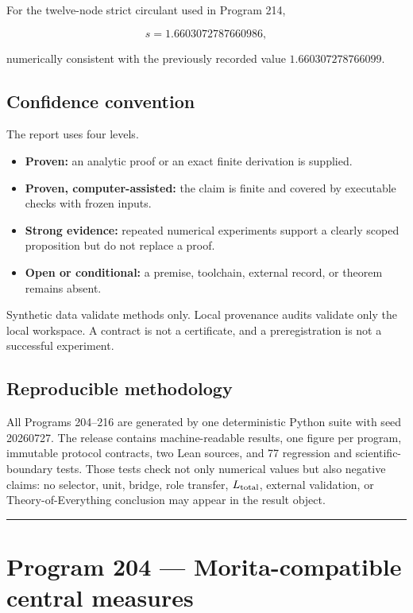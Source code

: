 \documentclass[11pt,a4paper,openany]{report}
\begin{document}
For the twelve-node strict circulant used in Program 214,

\[
s=1.6603072787660986,
\]

numerically consistent with the previously recorded value \(1.660307278766099\).

\section{Confidence convention}

The report uses four levels.

\begin{itemize}
\item 
\textbf{Proven:} an analytic proof or an exact finite derivation is supplied.

\item 
\textbf{Proven, computer-assisted:} the claim is finite and covered by executable checks with frozen inputs.

\item 
\textbf{Strong evidence:} repeated numerical experiments support a clearly scoped proposition but do not replace a proof.

\item 
\textbf{Open or conditional:} a premise, toolchain, external record, or theorem remains absent.

\end{itemize}

Synthetic data validate methods only. Local provenance audits validate only the local workspace. A contract is not a certificate, and a preregistration is not a successful experiment.

\section{Reproducible methodology}

All Programs 204--216 are generated by one deterministic Python suite with seed 20260727. The release contains machine-readable results, one figure per program, immutable protocol contracts, two Lean sources, and 77 regression and scientific-boundary tests. Those tests check not only numerical values but also negative claims: no selector, unit, bridge, role transfer, \(L_{\rm total}\), external validation, or Theory-of-Everything conclusion may appear in the result object.

\par\medskip\hrule\medskip

\chapter{Program 204 --- Morita-compatible central measures}
\end{document}
